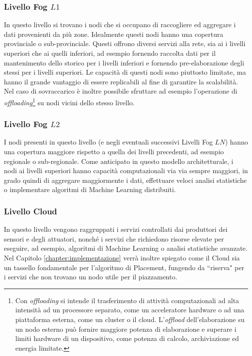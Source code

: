 \subsubsection{Livello Fog $L1$}

In questo livello si trovano i nodi che si occupano di raccogliere ed aggregare i dati provenienti da più zone. Idealmente questi nodi hanno una copertura provinciale o sub-provinciale. Questi offrono diversi servizi alla rete, sia ai i livelli superiori che ai quelli inferiori, ad esempio fornendo raccolta dati per il mantenimento dello storico per i livelli inferiori e fornendo pre-elaborazione degli stessi per i livelli superiori. Le capacità di questi nodi sono piuttosto limitate, ma hanno il grande vantaggio di essere replicabili al fine di garantire la scalabilità. Nel caso di sovraccarico è inoltre possibile sfruttare ad esempio l'operazione di \textit{offloading}\footnote{Con \textit{offloading} si intende il trasferimento di attività computazionali ad alta intensità ad un processore separato, come un acceleratore hardware o ad una piattaforma esterna, come un cluster o il cloud. L'\textit{offload} dell'elaborazione su un nodo esterno può fornire maggiore potenza di elaborazione e superare i limiti hardware di un dispositivo, come potenza di calcolo, archiviazione ed energia limitate.} su nodi vicini dello stesso livello.

\subsubsection{Livello Fog $L2$}
I nodi presenti in questo livello (e negli eventuali successivi Livelli Fog $LN$) hanno una copertura maggiore rispetto a quella dei livelli precedenti, ad esempio regionale o sub-regionale. Come anticipato in questo modello architetturale, i nodi ai livelli superiori hanno capacità computazionali via via sempre maggiori, in grado quindi di aggregare maggiormente i dati, effettuare veloci analisi statistiche o implementare algoritmi di Machine Learning distribuiti.

\subsubsection{Livello Cloud}

In questo livello vengono raggruppati i servizi controllati dai produttori dei sensori e degli attuatori, nonché i servizi che richiedono risorse elevate per eseguire, ad esempio, algoritmi di Machine Learning o analisi statistiche avanzate. Nel Capitolo \ref{chapter:implementazione} verrà inoltre spiegato come il Cloud sia un tassello fondamentale per l'algoritmo di Placement, fungendo da ``riserva" per i servizi che non trovano un nodo utile per il piazzamento.

